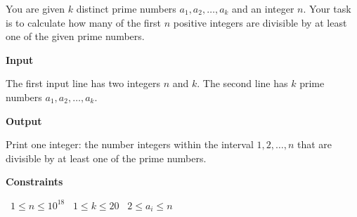 You are given $k$ distinct prime numbers $a_1,a_2,\ldots,a_k$ and an integer $n$.
Your task is to calculate how many of the first $n$ positive integers are divisible by at least one of the given prime numbers.

\vspace{0.3cm}\noindent\textbf{Input}

The first input line has two integers $n$ and $k$.
The second line has $k$ prime numbers $a_1,a_2,\ldots,a_k$.

\vspace{0.3cm}\noindent\textbf{Output}

Print one integer: the number integers within the interval $1,2,\ldots,n$ that are divisible by at least one of the prime numbers.

\vspace{0.3cm}\noindent\textbf{Constraints}

\textbullet\ $1 \le n \le 10^{18}$
\textbullet\ $1 \le k \le 20$
\textbullet\ $2 \le a_i \le n$